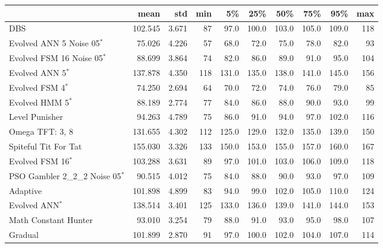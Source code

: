 \begin{tabular}{lrrrrrrrrr}
\toprule
{} &     mean &    std &  min &     5\% &    25\% &    50\% &    75\% &    95\% &  max \\
\midrule
DBS                              &  102.545 &  3.671 &   87 &   97.0 &  100.0 &  103.0 &  105.0 &  109.0 &  118 \\
Evolved ANN 5 Noise 05$^{*}$     &   75.026 &  4.226 &   57 &   68.0 &   72.0 &   75.0 &   78.0 &   82.0 &   93 \\
Evolved FSM 16 Noise 05$^{*}$    &   88.699 &  3.864 &   74 &   82.0 &   86.0 &   89.0 &   91.0 &   95.0 &  104 \\
Evolved ANN 5$^{*}$              &  137.878 &  4.350 &  118 &  131.0 &  135.0 &  138.0 &  141.0 &  145.0 &  156 \\
Evolved FSM 4$^{*}$              &   74.250 &  2.694 &   64 &   70.0 &   72.0 &   74.0 &   76.0 &   79.0 &   85 \\
Evolved HMM 5$^{*}$              &   88.189 &  2.774 &   77 &   84.0 &   86.0 &   88.0 &   90.0 &   93.0 &   99 \\
Level Punisher                   &   94.263 &  4.789 &   75 &   86.0 &   91.0 &   94.0 &   97.0 &  102.0 &  116 \\
Omega TFT: 3, 8                  &  131.655 &  4.302 &  112 &  125.0 &  129.0 &  132.0 &  135.0 &  139.0 &  150 \\
Spiteful Tit For Tat             &  155.030 &  3.326 &  133 &  150.0 &  153.0 &  155.0 &  157.0 &  160.0 &  167 \\
Evolved FSM 16$^{*}$             &  103.288 &  3.631 &   89 &   97.0 &  101.0 &  103.0 &  106.0 &  109.0 &  118 \\
PSO Gambler 2\_2\_2 Noise 05$^{*}$ &   90.515 &  4.012 &   75 &   84.0 &   88.0 &   90.0 &   93.0 &   97.0 &  109 \\
Adaptive                         &  101.898 &  4.899 &   83 &   94.0 &   99.0 &  102.0 &  105.0 &  110.0 &  124 \\
Evolved ANN$^{*}$                &  138.514 &  3.401 &  125 &  133.0 &  136.0 &  139.0 &  141.0 &  144.0 &  153 \\
Math Constant Hunter             &   93.010 &  3.254 &   79 &   88.0 &   91.0 &   93.0 &   95.0 &   98.0 &  107 \\
Gradual                          &  101.899 &  2.870 &   91 &   97.0 &  100.0 &  102.0 &  104.0 &  107.0 &  114 \\
\bottomrule
\end{tabular}
